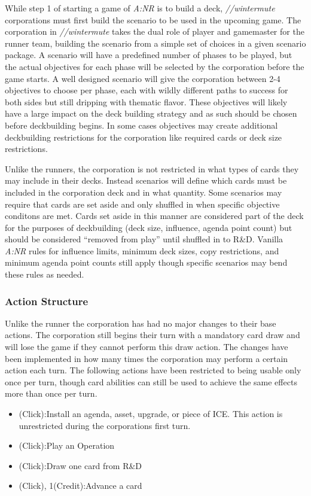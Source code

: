 \documentclass[titlepage]{article}
\begin{document}
			While step 1 of starting a game of \emph{A:NR} is to build a deck, \emph{//wintermute} corporations must first build the scenario to be used in the upcoming game. The corporation in \emph{//wintermute} takes the dual role of player and gamemaster for the runner team, building the scenario from a simple set of choices in a given scenario package. A scenario will have a predefined number of phases to be played, but the actual objectives for each phase will be selected by the corporation before the game starts. A well designed scenario will give the corporation between 2-4 objectives to choose per phase, each with wildly different paths to success for both sides but still dripping with thematic flavor. These objectives will likely have a large impact on the deck building strategy and as such should be chosen before deckbuilding begins. In some cases objectives may create additional deckbuilding restrictions for the corporation like required cards or deck size restrictions.

			Unlike the runners, the corporation is not restricted in what types of cards they may include in their decks. Instead scenarios will define which cards must be included in the corporation deck and in what quantity. Some scenarios may require that cards are set aside and only shuffled in when specific objective conditons are met. Cards set aside in this manner are considered part of the deck for the purposes of deckbuilding (deck size, influence, agenda point count) but should be considered ``removed from play'' until shuffled in to R\&D. Vanilla \emph{A:NR} rules for influence limits, minimum deck sizes, copy restrictions, and minimum agenda point counts still apply though specific scenarios may bend these rules as needed.

		\subsubsection{Action Structure}

			Unlike the runner the corporation has had no major changes to their base actions. The corporation still begins their turn with a mandatory card draw and will lose the game if they cannot perform this draw action. The changes have been implemented in how many times the corporation may perform a certain action each turn. The following actions have been restricted to being usable only once per turn, though card abilities can still be used to achieve the same effects more than once per turn.

			\begin{itemize}

				\item (Click):Install an agenda, asset, upgrade, or piece of ICE. This action is unrestricted during the corporations first turn.

				\item (Click):Play an Operation

				\item (Click):Draw one card from R\&D

				\item (Click), 1(Credit):Advance a card

			\end{itemize}
\end{document}
